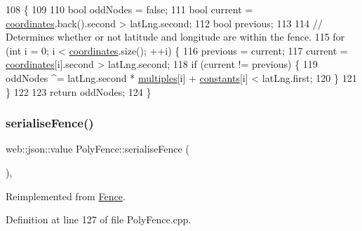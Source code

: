 \begin{DoxyCode}
108 \{
109 
110     \textcolor{keywordtype}{bool} oddNodes = \textcolor{keyword}{false};
111     \textcolor{keywordtype}{bool} current = \hyperlink{class_poly_fence_ae8e0c55e745979cab104ef80aeb4b418}{coordinates}.back().second > latLng.second;
112     \textcolor{keywordtype}{bool} previous;
113 
114     \textcolor{comment}{// Determines whether or not latitude and longitude are within the fence.}
115     \textcolor{keywordflow}{for} (\textcolor{keywordtype}{int} i = 0; i < \hyperlink{class_poly_fence_ae8e0c55e745979cab104ef80aeb4b418}{coordinates}.size(); ++i) \{
116         previous = current;
117         current = \hyperlink{class_poly_fence_ae8e0c55e745979cab104ef80aeb4b418}{coordinates}[i].second > latLng.second;
118         \textcolor{keywordflow}{if} (current != previous) \{
119             oddNodes ^= latLng.second * \hyperlink{class_poly_fence_a2204e62b61b0e3c335734fa0b6cf0728}{multiples}[i] + \hyperlink{class_poly_fence_a24c99bb8a45f86bdf51cd3f22ef0f174}{constants}[i] < latLng.first;
120         \}
121     \}
122 
123     \textcolor{keywordflow}{return} oddNodes;
124 \}
\end{DoxyCode}
\mbox{\label{class_poly_fence_ae748da10e4fd15f87b74e0d996f00103}} 
\subsubsection{\texorpdfstring{serialise\+Fence()}{serialiseFence()}}
{\footnotesize\ttfamily web\+::json\+::value Poly\+Fence\+::serialise\+Fence (\begin{DoxyParamCaption}{ }\end{DoxyParamCaption})\hspace{0.3cm}{\ttfamily [override]}, {\ttfamily [virtual]}}



Reimplemented from \hyperlink{class_fence_a5c8529e80a4444cc9ca0fb660cbf07c8}{Fence}.



Definition at line 127 of file Poly\+Fence.\+cpp.


